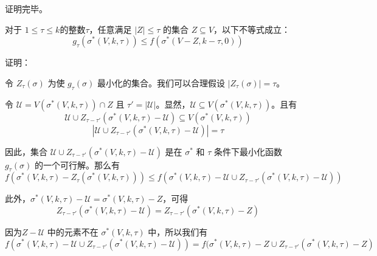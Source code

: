 证明完毕。

\begin{lemma}
\label{lem:lem3}
对于 $1 \le \tau \le k$的整数$\tau$，任意满足 $|Z| \le \tau$ 的集合 $Z \subseteq V$，以下不等式成立：
\begin{equation}
g_\tau (\sigma^*(V,k,\tau)) \le f(\sigma^*(V-Z,k-\tau,0))
\end{equation}

\end{lemma}

证明：

令 $Z_{\tau}(\sigma)$ 为使 $g_{\tau}(\sigma)$ 最小化的集合。我们可以合理假设 $|Z_{\tau}(\sigma)|=\tau$。

令 $\mathcal{U}=V(\sigma^*(V,k,\tau)) \cap Z$ 且 $\tau'=|\mathcal{U}|$。显然，$\mathcal{U}\subseteq V(\sigma^*(V,k,\tau))$。且有
\begin{equation}
\mathcal{U} \cup Z_{\tau-\tau'}(\sigma^*(V,k,\tau)-\mathcal{U}) \subseteq V(\sigma^*(V,k,\tau)) 
\end{equation}
\begin{equation}
|\mathcal{U} \cup Z_{\tau-\tau'}(\sigma^*(V,k,\tau)-\mathcal{U})| =\tau
\end{equation}

因此，集合 $\mathcal{U} \cup Z_{\tau-\tau'}(\sigma^*(V,k,\tau)-\mathcal{U})$ 是在 $\sigma^*$ 和 $\tau$ 条件下最小化函数 $g_\tau(\sigma)$ 的一个可行解。那么有
\begin{equation}
    f(\sigma^*(V,k,\tau) -Z_\tau(\sigma^*(V,k,\tau))) \le f(\sigma^*(V,k,\tau) - \mathcal{U} \cup Z_{\tau-\tau'}(\sigma^*(V,k,\tau)-\mathcal{U}))
\end{equation}

此外，$\sigma^*(V,k,\tau)-\mathcal{U} = \sigma^*(V,k,\tau) - Z$，可得
\begin{equation}
Z_{\tau-\tau'}(\sigma^*(V,k,\tau) - \mathcal{U}) = Z_{\tau-\tau'}(\sigma^*(V,k,\tau) - Z)
\end{equation}

因为$Z-\mathcal{U}$ 中的元素不在 $\sigma^*(V,k,\tau)$ 中，所以我们有
\begin{equation}
    f( \sigma^*(V,k,\tau) - \mathcal{U} \cup Z_{\tau-\tau'}(\sigma^*(V,k,\tau) - \mathcal{U}) ) = f( \sigma^*(V,k,\tau) - Z \cup Z_{\tau-\tau'}(\sigma^*(V,k,\tau) - Z)
\end{equation}

